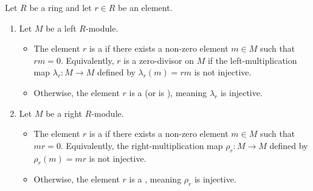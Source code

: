\begin{definition} \label{definition:zero_divisor_on_a_module_over_a_ring}
Let $R$ be a ring and let $r \in R$ be an element. 

\begin{enumerate}
    \item Let $M$ be a left $R$-module. 
    \begin{itemize}
        \item The element $r$ is a  if there exists a non-zero element $m \in M$ such that $rm = 0$. Equivalently, $r$ is a zero-divisor on $M$ if the left-multiplication map $\lambda_r \colon M \to M$ defined by $\lambda_r(m) = rm$ is not injective.
        \item Otherwise, the element $r$ is a  (or is ), meaning $\lambda_r$ is injective.
    \end{itemize}

    \item Let $M$ be a right $R$-module.
    \begin{itemize}
        \item The element $r$ is a  if there exists a non-zero element $m \in M$ such that $mr = 0$. Equivalently, the right-multiplication map $\rho_r \colon M \to M$ defined by $\rho_r(m) = mr$ is not injective.
        \item Otherwise, the element $r$ is a , meaning $\rho_r$ is injective.
    \end{itemize}
\end{enumerate}
\end{definition}